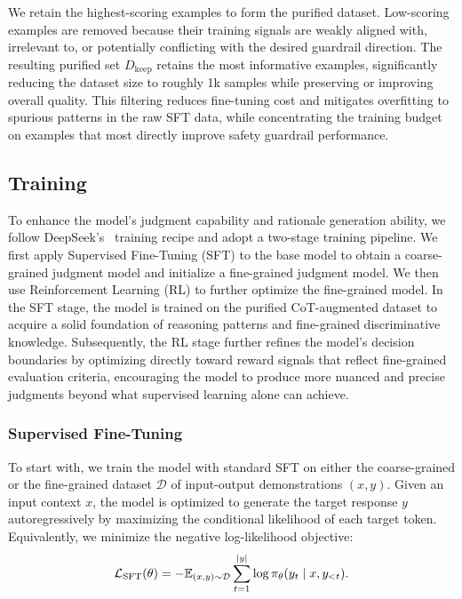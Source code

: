 We retain the highest-scoring examples to form the purified dataset. Low-scoring examples are removed because their training signals are weakly aligned with, irrelevant to, or potentially conflicting with the desired guardrail direction. The resulting purified set \(D_{\mathrm{keep}}\) retains the most informative examples, significantly reducing the dataset size to roughly 1k samples while preserving or improving overall quality. This filtering reduces fine-tuning cost and mitigates overfitting to spurious patterns in the raw SFT data, while concentrating the training budget on examples that most directly improve safety guardrail performance.



\subsection{Training}
\label{subsec:train}

To enhance the model's judgment capability and rationale generation ability, we follow DeepSeek's~\citep{guo2025deepseek} training recipe and adopt a two-stage training pipeline. We first apply Supervised Fine-Tuning (SFT) to the base model to obtain a coarse-grained judgment model and initialize a fine-grained judgment model. We then use Reinforcement Learning (RL) to further optimize the fine-grained model. In the SFT stage, the model is trained on the purified CoT-augmented dataset to acquire a solid foundation of
reasoning patterns and fine-grained discriminative knowledge. Subsequently,
the RL stage further refines the model's decision boundaries by optimizing
directly toward reward signals that reflect fine-grained evaluation
criteria, encouraging the model to produce more nuanced and precise
judgments beyond what supervised learning alone can achieve.


\subsubsection{Supervised Fine-Tuning}
To start with, we train the model with standard SFT on either the coarse-grained or the fine-grained dataset $\mathcal{D}$ of input-output demonstrations $(x,y)$. Given an input context $x$, the model is optimized to generate the target response
$y$ autoregressively by maximizing the conditional likelihood of each
target token. Equivalently, we minimize the negative log-likelihood
objective:
\begin{equation}
\small
\mathcal{L}_{\mathrm{SFT}}(\theta)
=
-\mathbb{E}_{(x,y)\sim \mathcal{D}}
\sum_{t=1}^{|y|}
\log \pi_\theta(y_t \mid x, y_{<t}).
\label{eq:sft-objective}
\end{equation}

